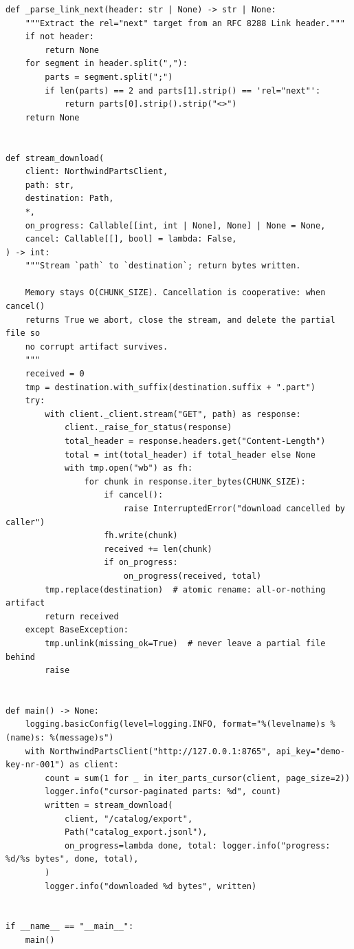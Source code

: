 \begin{verbatim}
def _parse_link_next(header: str | None) -> str | None:
    """Extract the rel="next" target from an RFC 8288 Link header."""
    if not header:
        return None
    for segment in header.split(","):
        parts = segment.split(";")
        if len(parts) == 2 and parts[1].strip() == 'rel="next"':
            return parts[0].strip().strip("<>")
    return None


def stream_download(
    client: NorthwindPartsClient,
    path: str,
    destination: Path,
    *,
    on_progress: Callable[[int, int | None], None] | None = None,
    cancel: Callable[[], bool] = lambda: False,
) -> int:
    """Stream `path` to `destination`; return bytes written.

    Memory stays O(CHUNK_SIZE). Cancellation is cooperative: when cancel()
    returns True we abort, close the stream, and delete the partial file so
    no corrupt artifact survives.
    """
    received = 0
    tmp = destination.with_suffix(destination.suffix + ".part")
    try:
        with client._client.stream("GET", path) as response:
            client._raise_for_status(response)
            total_header = response.headers.get("Content-Length")
            total = int(total_header) if total_header else None
            with tmp.open("wb") as fh:
                for chunk in response.iter_bytes(CHUNK_SIZE):
                    if cancel():
                        raise InterruptedError("download cancelled by caller")
                    fh.write(chunk)
                    received += len(chunk)
                    if on_progress:
                        on_progress(received, total)
        tmp.replace(destination)  # atomic rename: all-or-nothing artifact
        return received
    except BaseException:
        tmp.unlink(missing_ok=True)  # never leave a partial file behind
        raise


def main() -> None:
    logging.basicConfig(level=logging.INFO, format="%(levelname)s %(name)s: %(message)s")
    with NorthwindPartsClient("http://127.0.0.1:8765", api_key="demo-key-nr-001") as client:
        count = sum(1 for _ in iter_parts_cursor(client, page_size=2))
        logger.info("cursor-paginated parts: %d", count)
        written = stream_download(
            client, "/catalog/export",
            Path("catalog_export.jsonl"),
            on_progress=lambda done, total: logger.info("progress: %d/%s bytes", done, total),
        )
        logger.info("downloaded %d bytes", written)


if __name__ == "__main__":
    main()
\end{verbatim}

